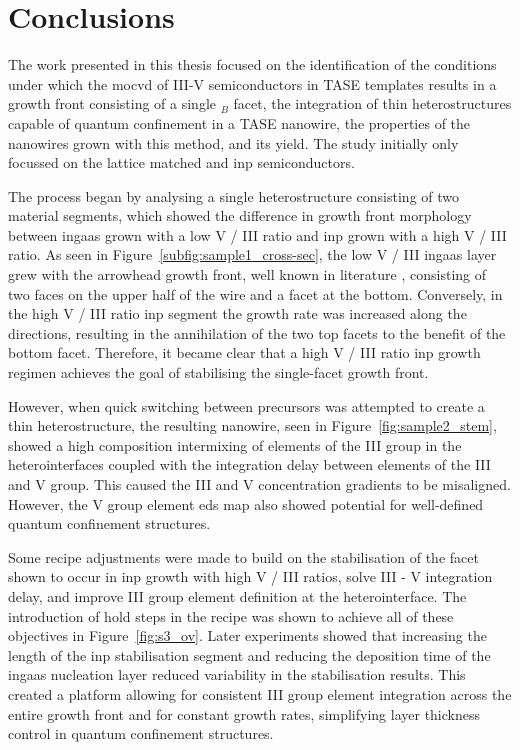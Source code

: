\chapter{Conclusions}
\label{chap:conclusions}

The work presented in this thesis focused on the identification of the conditions under which the \acf{mocvd} of III-V semiconductors in \acf{TASE} templates results in a growth front consisting of a single \(_B\) facet, the integration of thin heterostructures capable of quantum confinement in a \acs{TASE} nanowire, the properties of the nanowires grown with this method, and its yield. The study initially only focussed on the lattice matched  and \acs{inp} semiconductors.

The process began by analysing a single heterostructure consisting of two material segments, which showed the difference in growth front morphology between \acf{ingaas} grown with a low V / III ratio and \acf{inp} grown with a high V / III ratio. As seen in Figure~\ref{subfig:sample1_cross-sec}, the low V / III \acs{ingaas} layer grew with the arrowhead growth front, well known in literature \cite{Knoedler2017}, consisting of two  faces on the upper half of the wire and a  facet at the bottom. Conversely, in the high V / III ratio \acs{inp} segment the growth rate was increased along the  directions, resulting in the annihilation of the two top  facets to the benefit of the bottom  facet. Therefore, it became clear that a high V / III ratio \acs{inp} growth regimen achieves the goal of stabilising the single-facet growth front.

However, when quick switching between precursors was attempted to create a thin heterostructure, the resulting nanowire, seen in Figure~\ref{fig:sample2_stem}, showed a high composition intermixing of elements of the III group in the heterointerfaces coupled with the integration delay between elements of the III and V group. This caused the III and V concentration gradients to be misaligned. However, the V group element \acf{eds} map also showed potential for well-defined quantum confinement structures.

Some recipe adjustments were made to build on the stabilisation of the  facet shown to occur in \acs{inp} growth with high V / III ratios, solve III - V integration delay, and improve III group element definition at the heterointerface. The introduction of hold steps in the recipe was shown to achieve all of these objectives in Figure~\ref{fig:s3_ov}. Later experiments showed that increasing the length of the \acs{inp} stabilisation segment and reducing the deposition time of the \acs{ingaas} nucleation layer reduced variability in the stabilisation results. This created a platform allowing for consistent III group element integration across the entire growth front and for constant growth rates, simplifying layer thickness control in quantum confinement structures.

